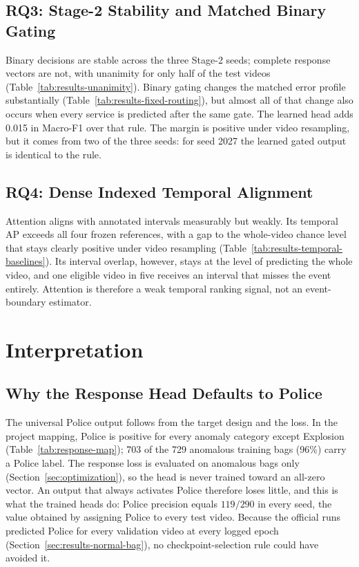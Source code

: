 \subsection{RQ3: Stage-2 Stability and Matched Binary Gating}
\label{sec:discussion-rq3}

Binary decisions are stable across the three Stage-2 seeds; complete response
vectors are not, with unanimity for only half of the test videos
(Table~\ref{tab:results-unanimity}). Binary gating changes the matched error
profile substantially (Table~\ref{tab:results-fixed-routing}), but almost all
of that change also occurs when every service is predicted after the same gate.
The learned head adds 0.015 in Macro-F1 over that rule. The margin is positive
under video resampling, but it comes from two of the three seeds: for seed 2027
the learned gated output is identical to the rule.

\subsection{RQ4: Dense Indexed Temporal Alignment}
\label{sec:discussion-rq4}

Attention aligns with annotated intervals measurably but weakly. Its temporal
AP exceeds all four frozen references, with a gap to the whole-video chance
level that stays clearly positive under video resampling
(Table~\ref{tab:results-temporal-baselines}). Its interval overlap, however,
stays at the level of predicting the whole video, and one eligible video in five
receives an interval that misses the event entirely. Attention is therefore a
weak temporal ranking signal, not an event-boundary estimator.

\section{Interpretation}
\label{sec:discussion-evidence}

\subsection{Why the Response Head Defaults to Police}
\label{sec:discussion-police}

The universal Police output follows from the target design and the loss. In
the project mapping, Police is positive for every anomaly category except
Explosion (Table~\ref{tab:response-map}); 703 of the 729 anomalous training bags
(96\%) carry a Police label. The response loss is evaluated on anomalous bags
only (Section~\ref{sec:optimization}), so the head is never trained toward an
all-zero vector. An output that always activates Police therefore loses little,
and this is what the trained heads do: Police precision equals $119/290$ in every
seed, the value obtained by assigning Police to every test video. Because the
official runs predicted Police for every validation video at every logged epoch
(Section~\ref{sec:results-normal-bag}), no checkpoint-selection rule could have
avoided it.

